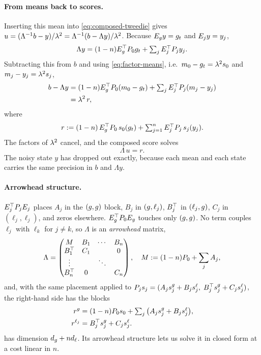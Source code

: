 \paragraph{From means back to scores.}
Inserting this mean into \cref{eq:composed-tweedie} gives $u=(\Lambda^{-1}b-y)/\lambda^2=\Lambda^{-1}(b-\Lambda y)/\lambda^2$.
Because $E_g y=g_t$ and $E_jy=y_j$,
\[
  \Lambda y=(1-n)E_g^\top P_{0}g_t+\textstyle\sum_jE_j^\top P_jy_j .
\]
Subtracting this from $b$ and using \cref{eq:factor-means}, i.e.\ $m_0-g_t=\lambda^2s_0$ and $m_j-y_j=\lambda^2s_j$,
\[
\begin{aligned}
  b-\Lambda y&=(1-n)E_g^\top P_{0}(m_0-g_t)+\textstyle\sum_jE_j^\top P_j(m_j-y_j)\\
  &=\lambda^2\,r ,
\end{aligned}
\]
where
\begin{equation}\label{eq:rhs}
  r:=(1-n)\,E_g^\top P_{0}\,s_0(g_t)+\textstyle\sum_{j=1}^{n}E_j^\top P_j\,s_j(y_j).
\end{equation}
The factors of $\lambda^2$ cancel, and the composed score solves
\begin{equation}\label{eq:linear-system}
  \Lambda\,u=r .
\end{equation}
The noisy state $y$ has dropped out exactly, because each mean and each state carries the same precision in $b$ and $\Lambda y$.

\paragraph{Arrowhead structure.}
$E_j^\top P_jE_j$ places $A_j$ in the $(g,g)$ block, $B_j$ in $(g,\ell_j)$, $B_j^\top$ in $(\ell_j,g)$, $C_j$ in $(\ell_j,\ell_j)$, and zeros elsewhere.
$E_g^\top P_{0} E_g$ touches only $(g,g)$.
No term couples $\ell_j$ with $\ell_k$ for $j\neq k$, so $\Lambda$ is an \emph{arrowhead} matrix,
\begin{equation}\label{eq:arrowhead}
  \Lambda=\begin{pmatrix}
    M & B_1 & \cdots & B_n\\
    B_1^\top & C_1 & & 0\\
    \vdots & & \ddots & \\
    B_n^\top & 0 & & C_n
  \end{pmatrix},\quad M:=(1-n)P_{0}+\sum_jA_j,
\end{equation}
and, with the same placement applied to $P_js_j=(A_js_j^{g}+B_js_j^{\ell},\;B_j^\top s_j^{g}+C_js_j^{\ell})$, the right-hand side has the blocks
\begin{equation}\label{eq:rhs-blocks}
\begin{aligned}
  r^g&=(1-n)P_{0} s_0+\textstyle\sum_{j}\big(A_js_j^{g}+B_js_j^{\ell}\big),\\
  r^{\ell_j}&=B_j^\top s_j^{g}+C_js_j^{\ell} .
\end{aligned}
\end{equation}
 has dimension $d_g+nd_\ell$.
Its arrowhead structure lets us solve it in closed form at a cost linear in $n$.


